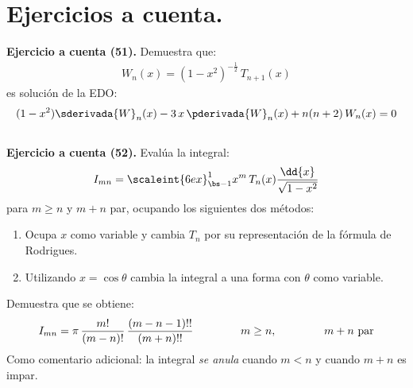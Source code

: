 \section{Ejercicios a cuenta.}

\noindent
\textbf{Ejercicio a cuenta (51). } Demuestra que:
\begin{align*}
W_{n}(x) = (1 -x^{2})^{-\frac{1}{2}} \, T_{n+1}(x)
\end{align*}
es solución de la EDO:
\begin{align*}
(1 -x^{2}) \sderivada{W}_{n}(x) - 3 \, x \, \pderivada{W}_{n}(x) + n (n + 2) \, W_{n}(x) = 0
\end{align*}
\\[1em]
\noindent
\textbf{Ejercicio a cuenta (52). } Evalúa la integral:
\begin{align*}
I_{mn} = \scaleint{6ex}_{\bs -1}^{1} x^{m} \, T_{n}(x) \dfrac{\dd{x}}{\sqrt{1 - x^{2}}}
\end{align*}
para $m \geq n$ y $m + n$ par, ocupando los siguientes dos métodos:
\begin{enumerate}[label=\alph*)]
\item Ocupa $x$ como variable y cambia $T_{n}$ por su representación de la fórmula de Rodrigues.
\item Utilizando $x = \cos \theta$ cambia la integral a una forma con $\theta$ como variable.
\end{enumerate}
Demuestra que se obtiene:
\begin{align*}
I_{mn} = \pi \, \dfrac{m!}{(m - n)!} \, \dfrac{(m - n - 1)!!}{(m + n)!!} \hspace{1.5cm} m \geq n, \hspace{1.5cm} m + n \mbox{ par}
\end{align*}
Como comentario adicional: la integral \emph{se anula} cuando $m < n$ y cuando $m + n$ es impar.

